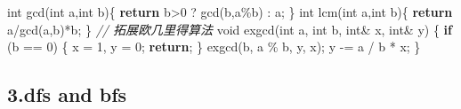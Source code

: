\documentclass[
]{article}
\newenvironment{Shaded}{}{}
\newcommand{\CommentTok}[1]{\textcolor[rgb]{0.38,0.63,0.69}{\textit{#1}}}
\newcommand{\ControlFlowTok}[1]{\textcolor[rgb]{0.00,0.44,0.13}{\textbf{#1}}}
\newcommand{\DataTypeTok}[1]{\textcolor[rgb]{0.56,0.13,0.00}{#1}}
\newcommand{\DecValTok}[1]{\textcolor[rgb]{0.25,0.63,0.44}{#1}}
\newcommand{\NormalTok}[1]{#1}
\newcommand{\OperatorTok}[1]{\textcolor[rgb]{0.40,0.40,0.40}{#1}}
\begin{document}
\begin{Shaded}
\begin{Highlighting}[]
\DataTypeTok{int}\NormalTok{ gcd}\OperatorTok{(}\DataTypeTok{int}\NormalTok{ a}\OperatorTok{,}\DataTypeTok{int}\NormalTok{ b}\OperatorTok{)\{}
	\ControlFlowTok{return}\NormalTok{ b}\OperatorTok{\textgreater{}}\DecValTok{0} \OperatorTok{?}\NormalTok{ gcd}\OperatorTok{(}\NormalTok{b}\OperatorTok{,}\NormalTok{a}\OperatorTok{\%}\NormalTok{b}\OperatorTok{)} \OperatorTok{:}\NormalTok{ a}\OperatorTok{;}
\OperatorTok{\}}
\DataTypeTok{int}\NormalTok{ lcm}\OperatorTok{(}\DataTypeTok{int}\NormalTok{ a}\OperatorTok{,}\DataTypeTok{int}\NormalTok{ b}\OperatorTok{)\{}
	\ControlFlowTok{return}\NormalTok{ a}\OperatorTok{/}\NormalTok{gcd}\OperatorTok{(}\NormalTok{a}\OperatorTok{,}\NormalTok{b}\OperatorTok{)*}\NormalTok{b}\OperatorTok{;}
\OperatorTok{\}}
\CommentTok{// 拓展欧几里得算法}
\DataTypeTok{void}\NormalTok{ exgcd}\OperatorTok{(}\DataTypeTok{int}\NormalTok{ a}\OperatorTok{,} \DataTypeTok{int}\NormalTok{ b}\OperatorTok{,} \DataTypeTok{int}\OperatorTok{\&}\NormalTok{ x}\OperatorTok{,} \DataTypeTok{int}\OperatorTok{\&}\NormalTok{ y}\OperatorTok{)} \OperatorTok{\{}
  \ControlFlowTok{if} \OperatorTok{(}\NormalTok{b }\OperatorTok{==} \DecValTok{0}\OperatorTok{)} \OperatorTok{\{}
\NormalTok{    x }\OperatorTok{=} \DecValTok{1}\OperatorTok{,}\NormalTok{ y }\OperatorTok{=} \DecValTok{0}\OperatorTok{;}
    \ControlFlowTok{return}\OperatorTok{;}
  \OperatorTok{\}}
\NormalTok{  exgcd}\OperatorTok{(}\NormalTok{b}\OperatorTok{,}\NormalTok{ a }\OperatorTok{\%}\NormalTok{ b}\OperatorTok{,}\NormalTok{ y}\OperatorTok{,}\NormalTok{ x}\OperatorTok{);}
\NormalTok{  y }\OperatorTok{{-}=}\NormalTok{ a }\OperatorTok{/}\NormalTok{ b }\OperatorTok{*}\NormalTok{ x}\OperatorTok{;}
\OperatorTok{\}}
\end{Highlighting}
\end{Shaded}

\hypertarget{3dfs-and-bfs}{%
\subsection{\texorpdfstring{3.dfs and bfs
}{3.dfs and bfs }}\label{3dfs-and-bfs}}
\end{document}
